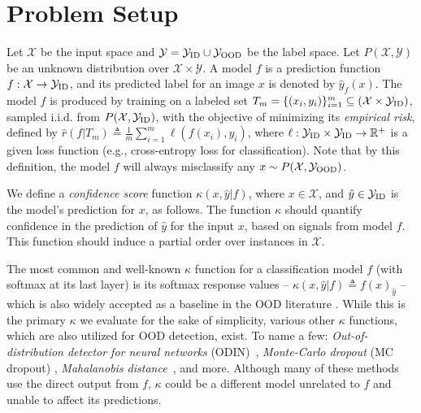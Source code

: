 \documentclass[table]{article} \usepackage{PRIMEarxiv}
\newcommand{\cY}{{\cal Y}}
\newcommand{\cX}{{\cal X}}
\begin{document}
\section{Problem Setup}
\label{sec:problem_setup}
Let $\mathcal{X}$ be the input space and $\mathcal{Y}=\cY_{\text{ID}} \cup \cY_{\text{OOD}}$ be the label space.
Let $P(\mathcal{X},\mathcal{Y})$ be an unknown distribution over $\mathcal{X} \times \mathcal{Y}$.
A model $f$ is a prediction function $f : \mathcal{X} \rightarrow \cY_{\text{ID}}$, and its predicted label for an image $x$ is denoted by $\hat{y}_f(x)$. 
The model $f$ is produced by training on a labeled set $T_m = \{(x_i,y_i)\}_{i=1}^m\subseteq (\mathcal{X}\times \cY_{\text{ID}})$, sampled i.i.d. from $P(\mathcal{X},\cY_{\text{ID}})$, with the objective of minimizing its \emph{empirical risk}, defined by $\hat{r}(f|T_m) \triangleq \frac{1}{m} \sum_{i=1}^m \ell (f(x_i),y_i)$, where $\ell : \cY_{\text{ID}}\times \cY_{\text{ID}} \rightarrow \mathbb{R}^+$ is a given loss function (e.g., cross-entropy loss for classification).
Note that by this definition, the model $f$ will always misclassify any $x \sim  P(\cX, \cY_{\text{OOD}})$.

We define a \emph{confidence score} function $\kappa(x,\hat{y}|f)$, where $x \in{\mathcal{X}}$, and $\hat{y} \in{\cY_{\text{ID}}}$ is the model's prediction for $x$, as follows.
The function $\kappa$ should quantify confidence in the prediction of $\hat{y}$ for the input $x$, based on signals from model $f$. This function should induce a partial order over instances in $\mathcal{X}$.


The most common and well-known $\kappa$ function for a classification model $f$ (with softmax at its last layer) is its softmax response values -- $\kappa(x,\hat{y}|f) \triangleq f(x)_{\hat{y}}$ \citep{410358,827457} -- which is also widely accepted as a baseline in the OOD literature \citep{DBLP:conf/iclr/HendrycksG17, DBLP:conf/cvpr/HendrycksZBSS21, DBLP:conf/miccai/BergerPGK21, DBLP:conf/nips/ShalevAK18}.
While this is the primary $\kappa$ we evaluate for the sake of simplicity, various other $\kappa$ functions, which are also utilized for OOD detection, exist. To name a few: \emph{Out-of-distribution detector for neural networks} (ODIN)~\citep{liang2018enhancing}, \emph{Monte-Carlo dropout} (MC dropout) \citep{gal2016dropout}, \emph{Mahalanobis distance}~\citep{DBLP:conf/nips/LeeLLS18}, and more. Although many of these methods use the direct output from $f$, $\kappa$ could be a different model unrelated to $f$ and unable to affect its predictions.
\end{document}
